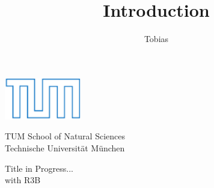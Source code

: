 \documentclass[12pt,twoside]{article}
\title{Introduction}
\author{Tobias}
\begin{document}
  \begin{titlepage}
\thispagestyle{empty}

\begin{center}
  \includegraphics[width=0.25\textwidth]{../figures/TUMLogo_oZ_Outline_blau_CMYK-eps-converted-to.pdf}
  
  \vspace{1em}
  \Large TUM School of Natural Sciences\\
  \vspace{1em}
  \large Technische Universität München\\
   \vspace{0.5em}
  \vspace{0.5em}
  
\end{center}

{%
  \centering %
  \vspace*{\baselineskip} %
  
  
	{\Large Title in Progress...  \\[0.3\baselineskip] with R3B    \\[0.3\baselineskip]
	}

  
}
\end{titlepage}
\end{document}
